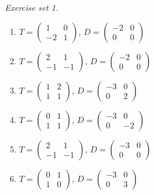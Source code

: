\par\noindent\emph{Exercise set 1.}\nopagebreak
\begin{enumerate}[label=\arabic*., leftmargin=*, itemsep=1pt]
\item $T=\left(\begin{smallmatrix}1 & 0\\ -2 & 1\end{smallmatrix}\right)$, $D=\left(\begin{smallmatrix}-2 & 0\\ 0 & 0\end{smallmatrix}\right)$
\item $T=\left(\begin{smallmatrix}2 & 1\\ -1 & -1\end{smallmatrix}\right)$, $D=\left(\begin{smallmatrix}-2 & 0\\ 0 & 0\end{smallmatrix}\right)$
\item $T=\left(\begin{smallmatrix}1 & 2\\ 1 & 1\end{smallmatrix}\right)$, $D=\left(\begin{smallmatrix}-3 & 0\\ 0 & 2\end{smallmatrix}\right)$
\item $T=\left(\begin{smallmatrix}0 & 1\\ 1 & 1\end{smallmatrix}\right)$, $D=\left(\begin{smallmatrix}-3 & 0\\ 0 & -2\end{smallmatrix}\right)$
\item $T=\left(\begin{smallmatrix}2 & 1\\ -1 & -1\end{smallmatrix}\right)$, $D=\left(\begin{smallmatrix}-3 & 0\\ 0 & 0\end{smallmatrix}\right)$
\item $T=\left(\begin{smallmatrix}0 & 1\\ 1 & 0\end{smallmatrix}\right)$, $D=\left(\begin{smallmatrix}-3 & 0\\ 0 & 3\end{smallmatrix}\right)$

\end{enumerate}
